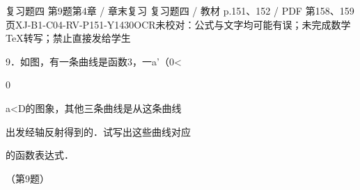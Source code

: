 \begin{bankitem}{复习题四 第9题}{第4章 / 章末复习 复习题四 / 教材 p.151、152 / PDF 第158、159页}{XJ-B1-C04-RV-P151-Y1430}{OCR未校对：公式与文字均可能有误；未完成数学TeX转写；禁止直接发给学生}
\begin{ocrdraft}
\par
9．如图，有一条曲线是函数3，一a'（0<
\par
0
\par
a<D的图象，其他三条曲线是从这条曲线
\par
出发经轴反射得到的．试写出这些曲线对应
\par
的函数表达式．
\par
（第9题）
\par
[教材p.152 / PDF第159页]
\end{ocrdraft}
\end{bankitem}
